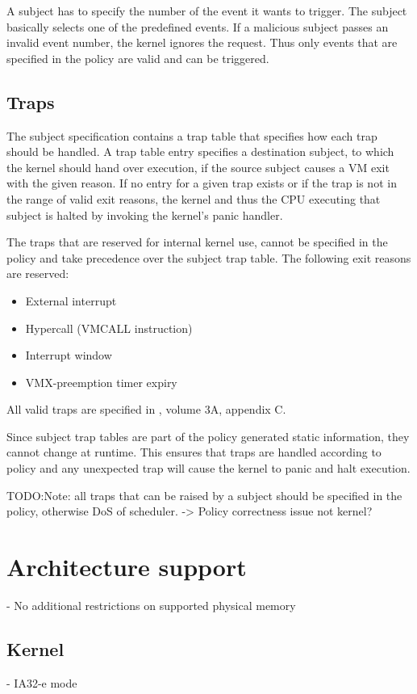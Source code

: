 A subject has to specify the number of the event it wants to trigger. The
subject basically selects one of the predefined events. If a malicious subject
passes an invalid event number, the kernel ignores the request. Thus only events
that are specified in the policy are valid and can be triggered.

\subsection{Traps}
The subject specification contains a trap table that specifies how each trap
should be handled. A trap table entry specifies a destination subject, to which
the kernel should hand over execution, if the source subject causes a VM exit
with the given reason. If no entry for a given trap exists or if the trap is not
in the range of valid exit reasons, the kernel and thus the CPU executing that
subject is halted by invoking the kernel's panic handler.

The traps that are reserved for internal kernel use, cannot be specified in the
policy and take precedence over the subject trap table. The following exit
reasons are reserved:

\begin{itemize}
	\item External interrupt
	\item Hypercall (VMCALL instruction)
	\item Interrupt window
	\item VMX-preemption timer expiry
\end{itemize}

All valid traps are specified in \cite{IntelSDM}, volume 3A, appendix C.

Since subject trap tables are part of the policy generated static information,
they cannot change at runtime. This ensures that traps are handled according to
policy and any unexpected trap will cause the kernel to panic and halt
execution.

TODO:Note: all traps that can be raised by a subject should be specified in the
policy, otherwise DoS of scheduler. -> Policy correctness issue not kernel?

\section{Architecture support}
- No additional restrictions on supported physical memory

\subsection{Kernel}
- IA32-e mode

